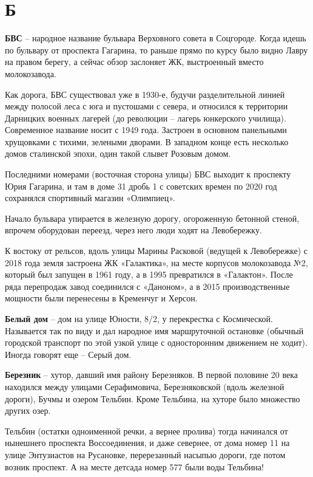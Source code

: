 \chapter*{Б}

\textbf{БВС} – народное название бульвара Верховного совета в Соцгороде. Когда идешь по бульвару от проспекта Гагарина, то раньше прямо по курсу было видно Лавру на правом берегу, а сейчас обзор заслоняет ЖК, выстроенный вместо молокозавода.

Как дорога, БВС существовал уже в 1930-е, будучи разделительной линией между полосой леса с юга и пустошами с севера, и относился к территории Дарницких военных лагерей (до революции – лагерь юнкерского училища). Современное название носит с 1949 года. Застроен в основном панельными хрущовками с тихими, зелеными дворами. В западном конце есть несколько домов сталинской эпохи, один такой слывет Розовым домом.

Последними номерами (восточная сторона улицы) БВС выходит к проспекту Юрия Гагарина, и там в доме 31 дробь 1 с советских времен по 2020 год сохранялся спортивный магазин «Олимпиец».

Начало бульвара упирается в железную дорогу, огороженную бетонной стеной, впрочем оборудован переезд, через него люди ходят на Левобережку.

К востоку от рельсов, вдоль улицы Марины Расковой (ведущей к Левобережке) с 2018 года земля застроена ЖК «Галактика», на месте корпусов молокозавода №2, который был запущен в 1961 году, а в 1995 превратился в «Галактон». После ряда перепродаж завод соединился с «Даноном», а в 2015 производственные мощности были перенесены в Кременчуг и Херсон.\\

\medskip

\textbf{Белый дом} – дом на улице Юности, 8/2, у перекрестка с Космической. Называется так по виду и дал народное имя маршруточной остановке (обычный городской транспорт по этой узкой улице с односторонним движением не ходит). Иногда говорят еще – Серый дом. \\

\medskip

\textbf{Березник} – хутор, давший имя району Березняков. В первой половине 20 века находился между улицами Серафимовича, Березняковской (вдоль железной дороги), Бучмы и озером Тельбин. Кроме Тельбина, на хуторе было множество других озер.

Тельбин (остатки одноименной речки, а вернее пролива) тогда начинался от нынешнего проспекта Воссоединения, и даже севернее, от дома номер 11 на улице Энтузиастов на Русановке, перерезанный насыпью дороги, где потом возник проспект. А на месте детсада номер 577 были воды Тельбина!

